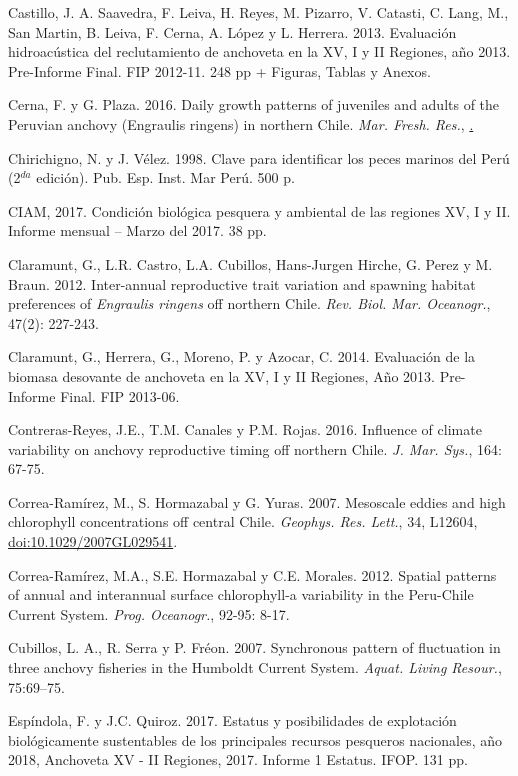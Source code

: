 \documentclass[letter,11pt]{article}
\begin{document}
Castillo, J. A. Saavedra, F. Leiva, H. Reyes, M. Pizarro, V. Catasti, C.
Lang, M., San Martin, B. Leiva, F. Cerna, A. L\'opez y L. Herrera. 2013.
Evaluaci\'on hidroac\'ustica del reclutamiento de anchoveta en la XV, I y II
Regiones, a\~{n}o 2013. Pre-Informe Final. FIP 2012-11. 248 pp + Figuras,
Tablas y Anexos.

Cerna, F. y G. Plaza. 2016. Daily growth patterns of juveniles and
adults of the Peruvian anchovy (Engraulis ringens) in northern Chile.
\textit{Mar. Fresh. Res.}, \href{http://dx.doi.org/10.1071/MF15032}.

Chirichigno, N. y J. V\'elez. 1998. Clave para identificar los peces
marinos del Per\'u (2$^{da}$ edici\'on). Pub. Esp. Inst. Mar Per\'u. 500 p.~

CIAM, 2017. Condici\'on biol\'ogica pesquera y ambiental de las regiones XV,
I y II. Informe mensual -- Marzo del 2017. 38 pp.

Claramunt, G., L.R. Castro, L.A. Cubillos, Hans-Jurgen Hirche, G. Perez
y M. Braun. 2012. Inter-annual reproductive trait variation and spawning
habitat preferences of \textit{Engraulis ringens} off northern Chile.
\textit{Rev. Biol. Mar. Oceanogr.}, 47(2): 227-243.

Claramunt, G., Herrera, G., Moreno, P. y Azocar, C. 2014. Evaluaci\'on de
la biomasa desovante de anchoveta en la XV, I y II Regiones, A\~{n}o 2013.
Pre-Informe Final. FIP 2013-06.

Contreras-Reyes, J.E., T.M. Canales y P.M. Rojas. 2016. Influence of
climate variability on anchovy reproductive timing off northern Chile.
\textit{J. Mar. Sys.}, 164: 67-75.

Correa-Ram\'irez, M., S. Hormazabal y G. Yuras. 2007. Mesoscale eddies and
high chlorophyll concentrations off central Chile.
\textit{Geophys.  Res. Lett.}, 34, L12604,
\url{doi:10.1029/2007GL029541}.

Correa-Ram\'irez, M.A., S.E. Hormazabal y C.E. Morales. 2012. Spatial
patterns of annual and interannual surface chlorophyll-a variability in
the Peru-Chile Current System. \textit{Prog. Oceanogr.}, 92-95: 8-17.

Cubillos, L. A., R. Serra y P. Fr\'eon. 2007. Synchronous pattern of
fluctuation in three anchovy fisheries in the Humboldt Current System.
\textit{Aquat. Living Resour.}, 75:69--75.

Esp\'indola, F. y J.C. Quiroz. 2017. Estatus y posibilidades de
explotaci\'on biol\'ogicamente sustentables de los principales recursos
pesqueros nacionales, a\~{n}o 2018, Anchoveta XV - II Regiones, 2017.
Informe 1 Estatus. IFOP. 131 pp.
\end{document}

